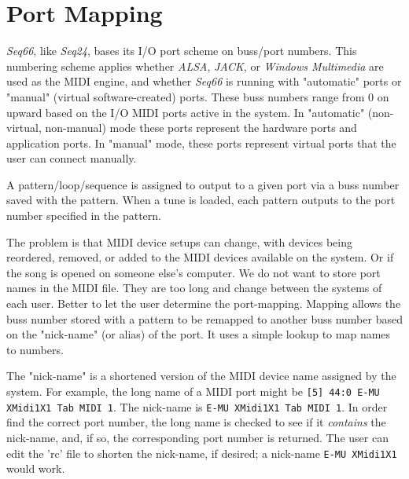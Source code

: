 %
%
%

\section{Port Mapping}
\label{sec:port_mapping}

   \textsl{Seq66}, like \textsl{Seq24}, bases its I/O port scheme on buss/port
   numbers.
   This numbering scheme applies whether
   \textsl{ALSA}, \textsl{JACK}, or \textsl{Windows Multimedia}
   are used as the MIDI engine, and whether \textsl{Seq66} is running with
   "automatic" ports or "manual" (virtual software-created) ports.
   These buss numbers range from 0 on upward
   based on the I/O MIDI ports active in the system.
   In "automatic" (non-virtual, non-manual) mode
   these ports represent the hardware ports and application ports.
   In "manual" mode, these ports represent virtual ports that the user
   can connect manually.

   A pattern/loop/sequence is assigned to output to a given port via
   a buss number saved with the pattern.  When a tune is loaded,
   each pattern outputs to the port number specified in the pattern.

   The problem is that MIDI device setups can change, with devices being
   reordered, removed, or added to the MIDI devices available on the system.
   Or if the song is opened on someone else's computer.
   We do not want to store port names in the MIDI file.
   They are too long and change between the systems of each user.
   Better to let the user determine the port-mapping.
   Mapping allows the buss number stored with a pattern to be
   remapped to another buss number based on the "nick-name" (or alias)
   of the port.
   It uses a simple lookup to map names to numbers.

   The "nick-name" is a shortened version of the MIDI device name assigned
   by the system.
   For example, the long name of a MIDI port might be
   \texttt{[5] 44:0 E-MU XMidi1X1 Tab MIDI 1}.
   The nick-name is \texttt{E-MU XMidi1X1 Tab MIDI 1}.
   In order find the correct port number, the long name is checked to see if it
   \textsl{contains} the nick-name, and, if so, the corresponding port number is
   returned.  The user can edit the 'rc' file to shorten the nick-name, if
   desired; a nick-name \texttt{E-MU XMidi1X1} would work.

